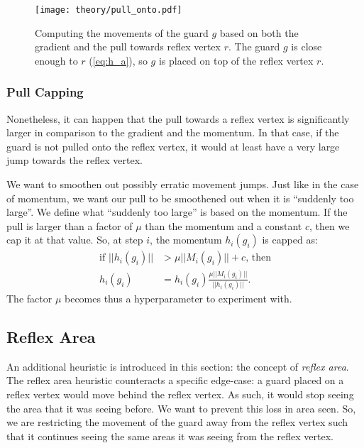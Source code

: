 \begin{figure}
    \centering
    \texttt{[image: theory/pull\_onto.pdf]}
    \caption{Computing the movements of the guard $g$ based on both the gradient and the pull towards reflex vertex $r$. The guard $g$ is close enough to $r$ (\ref{eq:h_a}), so $g$ is placed on top of the reflex vertex $r$.}
    \label{fig:pull_onto}
\end{figure}

\subsubsection{Pull Capping}
\label{sec:pull_capping}
Nonetheless, it can happen that the pull towards a reflex vertex is significantly larger in comparison to the gradient and the momentum. In that case, if the guard is not pulled onto the reflex vertex, it would at least have a very large jump towards the reflex vertex.

We want to smoothen out possibly erratic movement jumps. Just like in the case of momentum, we want our pull to be smoothened out when it is ``suddenly too large''. We define what ``suddenly too large'' is based on the momentum. If the pull is larger than a factor of $\mu$ than the momentum and a constant $c$, then we cap it at that value. So, at step $i$, the momentum $h_i(g_i)$ is capped as:
\begin{align*}
    \text{if } ||h_i(g_i)|| &> \mu ||M_i(g_i)|| + c \text{, then} \\
               h_i(g_i) &= h_i(g_i) \frac{\mu ||M_i(g_i)||}{||h_i(g_i)||}.
\end{align*}
The factor $\mu$ becomes thus a hyperparameter to experiment with.


\subsection{Reflex Area}
\label{sec:reflex_area}
An additional heuristic is introduced in this section: the concept of \textit{reflex area}. The reflex area heuristic counteracts a specific edge-case: a guard placed on a reflex vertex would move behind the reflex vertex. As such, it would stop seeing the area that it was seeing before. We want to prevent this loss in area seen. So, we are restricting the movement of the guard away from the reflex vertex such that it continues seeing the same areas it was seeing from the reflex vertex.

